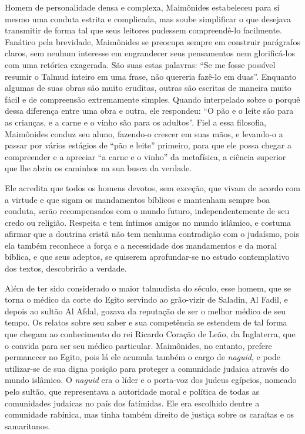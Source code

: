 Homem de personalidade densa e complexa, Maimônides estabeleceu para si
mesmo uma conduta estrita e complicada, mas soube simplificar o que
desejava transmitir de forma tal que seus leitores pudessem
compreendê-lo facilmente. Fanático pela brevidade, Maimônides se
preocupa sempre em construir parágrafos claros, sem nenhum interesse em engrandecer 
seus pensamentos nem glorificá-los com uma retórica exagerada. 
São suas estas palavras: ``Se me fosse possível resumir o Talmud inteiro em uma
frase, não quereria fazê-lo em duas''. Enquanto algumas de suas obras
são muito eruditas, outras são escritas de maneira muito fácil e de
compreensão extremamente simples. Quando interpelado sobre o porquê
dessa diferença entre uma obra e outra, ele respondeu: ``O pão e o
leite são para as crianças, e a carne e o vinho são para os adultos''.
Fiel a essa filosofia, Maimônides conduz seu aluno, fazendo-o crescer em
suas mãos, e levando-o a passar por vários estágios de ``pão e leite''
primeiro, para que ele possa chegar a compreender e a apreciar ``a carne
e o vinho'' da metafísica, a ciência superior que lhe abriu os caminhos
na sua busca da verdade.

Ele acredita que todos os homens devotos, sem exceção, que vivam de
acordo com a virtude e que sigam os mandamentos bíblicos e mantenham
sempre boa conduta, serão recompensados com o mundo futuro,
independentemente de seu credo ou religião. Respeita e tem íntimos
amigos no mundo islâmico, e costuma afirmar que a doutrina cristã não
tem nenhuma contradição com o judaísmo, pois ela também reconhece a
força e a necessidade dos mandamentos e da moral bíblica, e que seus
adeptos, se quiserem aprofundar-se no estudo contemplativo dos textos,
descobrirão a verdade.

Além de ter sido considerado o maior talmudista do século, esse homem,
que se torna o médico da corte do Egito servindo ao grão-vizir de
Saladin, Al Fadil, e depois ao sultão Al Afdal, gozava da reputação de
ser o melhor médico de seu tempo. Os relatos sobre seu saber e sua
competência se estendem de tal forma que chegam ao conhecimento do rei
Ricardo Coração de Leão, da Inglaterra, que o convida para ser seu
médico particular. Maimônides, no entanto, prefere permanecer no Egito,
pois lá ele acumula também o cargo de \emph{naguid}, e pode utilizar-se de sua
digna posição para proteger a comunidade judaica através do mundo
islâmico. O \emph{naguid} era o líder e o porta-voz dos judeus egípcios,
nomeado pelo sultão, que representava a autoridade moral e política
de todas as comunidades judaicas no país dos fatímidas. Ele era escolhido
dentre a comunidade rabínica, mas tinha também direito de justiça sobre
os caraítas e os samaritanos.


